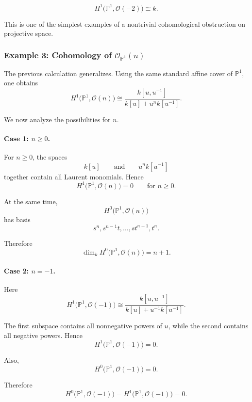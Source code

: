 \documentclass[12pt,a4paper]{article}
\theoremstyle{notespace}
\begin{document}
\[
\boxed{
	H^{1}\bigl(\mathbb{P}^{1},\mathcal{O}(-2)\bigr)
	\cong
	k.
}
\]

This is one of the simplest examples of a nontrivial cohomological
obstruction on projective space.

\subsubsection{Example 3: Cohomology of \texorpdfstring{\(\mathcal{O}_{\mathbb{P}^{1}}(n)\)}{O(n) on P1}}

The previous calculation generalizes. Using the same standard affine cover
of \(\mathbb{P}^{1}\), one obtains
\[
H^{1}\bigl(\mathbb{P}^{1},\mathcal{O}(n)\bigr)
\cong
\frac{k[u,u^{-1}]}
{k[u]+u^{n}k[u^{-1}]}.
\]

We now analyze the possibilities for \(n\).

\paragraph{Case 1: \(n\geq 0\).}

For \(n\geq 0\), the spaces
\[
k[u]
\qquad\text{and}\qquad
u^{n}k[u^{-1}]
\]
together contain all Laurent monomials. Hence
\[
H^{1}\bigl(\mathbb{P}^{1},\mathcal{O}(n)\bigr)=0
\qquad
\text{for }n\geq 0.
\]

At the same time,
\[
H^{0}\bigl(\mathbb{P}^{1},\mathcal{O}(n)\bigr)
\]
has basis
\[
s^{n},s^{n-1}t,\ldots,st^{n-1},t^{n}.
\]

Therefore
\[
\dim_{k}H^{0}\bigl(\mathbb{P}^{1},\mathcal{O}(n)\bigr)
=
n+1.
\]

\paragraph{Case 2: \(n=-1\).}

Here
\[
H^{1}\bigl(\mathbb{P}^{1},\mathcal{O}(-1)\bigr)
\cong
\frac{k[u,u^{-1}]}
{k[u]+u^{-1}k[u^{-1}]}.
\]

The first subspace contains all nonnegative powers of \(u\), while the
second contains all negative powers. Hence
\[
H^{1}\bigl(\mathbb{P}^{1},\mathcal{O}(-1)\bigr)=0.
\]

Also,
\[
H^{0}\bigl(\mathbb{P}^{1},\mathcal{O}(-1)\bigr)=0.
\]

Therefore
\[
\boxed{
	H^{0}\bigl(\mathbb{P}^{1},\mathcal{O}(-1)\bigr)
	=
	H^{1}\bigl(\mathbb{P}^{1},\mathcal{O}(-1)\bigr)
	=
	0.
}
\]
\end{document}
